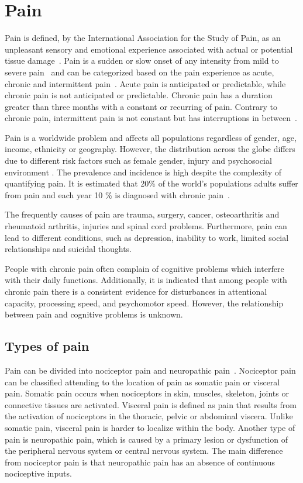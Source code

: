 \section{Pain} \label{sec:Pain}
Pain is defined, by the International Association for the Study of Pain, as an unpleasant sensory and emotional experience associated with actual or potential tissue damage~\cite{Kerstman2013}. 
Pain is a sudden or slow onset of any intensity from mild to severe pain~\cite{Mello2016} and can be categorized based on the pain experience as acute, chronic and intermittent pain~\cite{Goldberg2011}. Acute pain is anticipated or predictable, while  chronic pain is not anticipated or predictable. Chronic pain has a duration greater than three months with a constant or recurring of pain. Contrary to chronic pain, intermittent pain is not constant but has interruptions in between~\cite{Mello2016}.

Pain is a worldwide problem and affects all populations regardless of gender, age, income, ethnicity or geography. However, the distribution across the globe differs due to different risk factors such as female gender, injury and psychosocial environment \cite{Macfarlanea2016}.  The prevalence and incidence is high despite the complexity of quantifying pain. It is estimated that 20\% of the world's populations adults suffer from pain and each year 10 \% is diagnosed with chronic pain~\cite{Goldberg2011}. 

The frequently causes of pain are trauma, surgery, cancer, osteoarthritis and rheumatoid arthritis, injuries and spinal cord problems. Furthermore, pain can lead to different conditions, such as depression, inability to work, limited social relationships and suicidal thoughts.~\cite{Goldberg2011, Breivik2006}

People with chronic pain often complain of cognitive problems which interfere with their daily functions. Additionally, it is indicated that among people with chronic pain there is a consistent evidence for disturbances in attentional capacity, processing speed, and psychomotor speed. However, the relationship between pain and cognitive problems is unknown.~\cite{Geisser2018}

\subsection{Types of pain}
Pain can be divided into nociceptor pain and neuropathic pain~\cite{Steeds2013}. Nociceptor pain can be classified attending to the location of pain as somatic pain or visceral pain. Somatic pain occurs when nociceptors in skin, muscles, skeleton, joints or connective tissues are activated. Visceral pain is defined as pain that results from the activation of nociceptors in the thoracic, pelvic or abdominal viscera. Unlike somatic pain, visceral pain is harder to localize within the body. Another type of pain is neuropathic pain, which is caused by a primary lesion or dysfunction of the peripheral nervous system or central nervous system. The main difference from nociceptor pain is that neuropathic pain has an absence of continuous nociceptive inputs. \cite{Kerstman2013}

